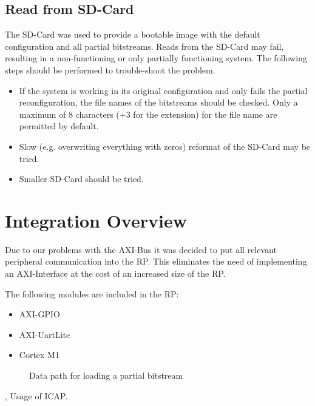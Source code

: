\subsection{Read from SD-Card}
The SD-Card was used to provide a bootable image with the default configuration and all partial bitstreams.
Reads from the SD-Card may fail, resulting in a non-functioning or only partially functioning system.
The following steps should be performed to trouble-shoot the problem. 
\begin{itemize}
    \item If the system is working in its original configuration and only fails the partial reconfiguration, the file names of the bitstreams should be checked. Only a maximum of 8 characters (+3 for the extension) for the file name are permitted by default. 
    \item Slow (e.g. overwriting everything with zeros) reformat of the SD-Card may be tried.
    \item Smaller SD-Card should be tried.
\end{itemize}
\section{Integration Overview}
Due to our problems with the AXI-Bus it was decided to put all relevant peripheral communication into the \gls{RP}.
This eliminates the need of implementing an AXI-Interface at the cost of an increased size of the \gls{RP}.

The following modules are included in the \gls{RP}:
\begin{itemize}
    \item  AXI-GPIO
    \item  AXI-UartLite
    \item  Cortex M1
\end{itemize}

\begin{figure}[ht]
    \centering
{}
\caption{Data path for loading a partial bitstream}\label{fig:prIntegration}
\end{figure}
\cite{xilinx_vivado_2018-1}, \cite{xilinx_vivado_2018}
Usage of \gls{ICAP}.
